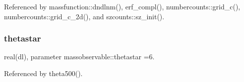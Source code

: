 Referenced by massfunction\+::dndlnm(), erf\+\_\+compl(), numbercounts\+::grid\+\_\+c(), numbercounts\+::grid\+\_\+c\+\_\+2d(), and szcounts\+::sz\+\_\+init().

\mbox{\label{namespacemassobservable_ad190951c647b00dc7f3cd907426e73df}} 
\subsubsection{\texorpdfstring{thetastar}{thetastar}}
{\footnotesize\ttfamily real(dl), parameter massobservable\+::thetastar =6.}



Referenced by theta500().

